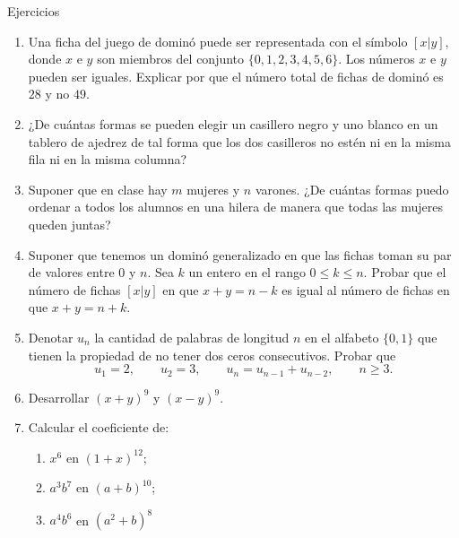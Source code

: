 \begin{section}{Ejercicios}
\begin{enumerate}

\item Una ficha del juego de dominó puede ser representada con el símbolo $[x|y]$,
donde $x$ e $y$ son miembros del conjunto $\{0,1,2,3,4,5,6\}$. Los números $x$
e $y$ pueden ser iguales. Explicar por que el número total de fichas de dominó
es $28$ y no $49$.

\item ¿De cuántas formas se pueden elegir un casillero negro y uno blanco en
un tablero de ajedrez de tal forma que los dos casilleros no estén ni en la misma
fila ni en la misma columna?

\item Suponer que en clase hay $m$ mujeres y $n$ varones. ¿De cuántas formas
puedo ordenar a todos los alumnos en una hilera de manera que todas las mujeres
queden juntas?

\item Suponer que tenemos un dominó generalizado en que las fichas toman su
par de valores entre $0$ y $n$. Sea $k$ un entero en el rango $0\le k \le n$.
Probar que el número de fichas $[x|y]$ en que $x+y = n-k$ es igual al número de
fichas en que  $x+y = n+k$.

\item Denotar $u_n$ la cantidad de palabras de longitud $n$ en el alfabeto
$\{0,1\}$ que tienen la propiedad de no tener dos ceros consecutivos. Probar que
$$
u_1=2,\qquad u_2=3,\qquad u_n =u_{n-1} +u_{n-2},\qquad n \ge 3.
$$

\item Desarrollar $(x+y)^9$ y $(x-y)^9$.

\item Calcular el coeficiente de:
\begin{multicols}{2}
\begin{enumerate}
    \item $x^6$ en $(1+x)^{12}$;
    
    \item $a^3b^7$ en $(a+b)^{10}$;
    
    \item $a^4b^6$ en $(a^2+b)^8$
\end{enumerate}
\end{multicols}


\end{enumerate}
\end{section}

